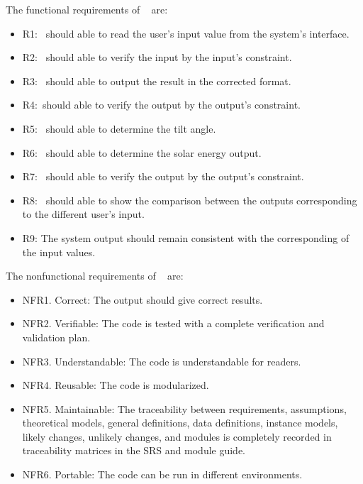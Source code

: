 \documentclass[12pt, titlepage]{article}
\begin{document}
The functional requirements of  \progname~ are:
\noindent \begin{itemize}

\item[ ]R1: \progname~should able to read the user's input value from the
system's interface.

\item[ ]R2: \progname~should able to verify the input by the input's constraint.

\item[ ]R3: \progname~should able to output the result in
the corrected format.

\item[ ]R4:\progname~should able to verify the output by the output's constraint.

\item[ ]R5: \progname~should able to determine the tilt angle.

\item[ ]R6: \progname~should able to determine the solar energy output.

\item[ ]R7: \progname~should able to verify the output by the output's constraint. 

\item[ ]R8: \progname~should able to show the comparison
between the outputs corresponding to the different user's input.


\item[ ]R9: The system output should remain consistent with
the corresponding of the input values.

\end{itemize}

The nonfunctional requirements  of  \progname~ are: 
\begin{itemize} 
\item[ ]NFR1. Correct: The output should give correct results.
\item[ ]NFR2. Verifiable: The code is tested with a complete verification and validation 
plan.
\item[ ]NFR3. Understandable: The code is understandable for readers. 
\item[ ]NFR4. Reusable: The code is modularized.
\item[ ]NFR5. Maintainable: The traceability between requirements, assumptions,
theoretical models, general definitions, data definitions, instance models,
likely changes, unlikely changes, and modules is completely recorded in
traceability matrices in the SRS and module guide.
\item[ ]NFR6. Portable: The code can be run in different environments.
\end{itemize}
\end{document}
